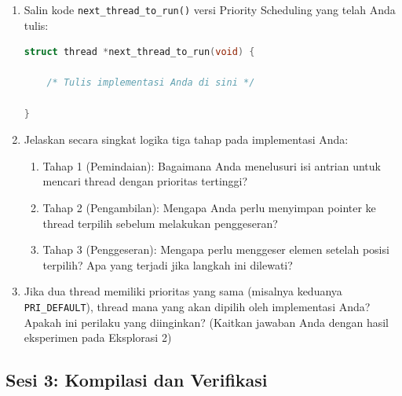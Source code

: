 \begin{enumerate}

	\item Salin kode \texttt{next\_thread\_to\_run()} versi Priority Scheduling yang telah Anda tulis:

	      \begin{lstlisting}[language=C, caption={Implementasi \texttt{next\_thread\_to\_run()} versi Priority oleh mahasiswa}]
struct thread *next_thread_to_run(void) {

    /* Tulis implementasi Anda di sini */

}
    \end{lstlisting}

	\item Jelaskan secara singkat logika tiga tahap pada implementasi Anda:
	      \begin{enumerate}
		      \item[(a)] Tahap 1 (Pemindaian): Bagaimana Anda menelusuri isi antrian untuk mencari thread dengan prioritas tertinggi?

		      \item[(b)] Tahap 2 (Pengambilan): Mengapa Anda perlu menyimpan pointer ke thread terpilih sebelum melakukan penggeseran?

		      \item[(c)] Tahap 3 (Penggeseran): Mengapa perlu menggeser elemen setelah posisi terpilih? Apa yang terjadi jika langkah ini dilewati?
	      \end{enumerate}

	\item Jika dua thread memiliki prioritas yang sama (misalnya keduanya \texttt{PRI\_DEFAULT}), thread mana yang akan dipilih oleh implementasi Anda? Apakah ini perilaku yang diinginkan? (Kaitkan jawaban Anda dengan hasil eksperimen pada Eksplorasi 2)

\end{enumerate}

\subsection{Sesi 3: Kompilasi dan Verifikasi}

